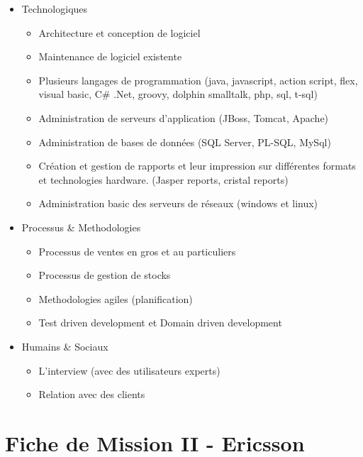 \documentclass{resume} %
\begin{document}
	\begin{itemize} 				
			\item Technologiques 
					\begin{itemize}
						\item Architecture et conception de logiciel 
						\item Maintenance de logiciel existente
						\item Plusieurs langages de programmation (java, javascript, action script, flex, visual basic, C\# .Net, groovy, dolphin smalltalk, php, sql, t-sql)
						\item Administration de serveurs d'application (JBoss, Tomcat, Apache)
						\item Administration de bases de données (SQL Server, PL-SQL, MySql)
						\item Création et gestion de rapports et leur impression sur différentes formats et technologies hardware. (Jasper reports, cristal reports)
						\item Administration basic des serveurs de réseaux (windows et linux)
					\end {itemize}
			\item Processus \& Methodologies 
					\begin{itemize}
						\item Processus de ventes en gros et au particuliers 
						\item Processus de gestion de stocks 
						\item Methodologies agiles (planification) 
						\item Test driven development et Domain driven development
					\end {itemize}
			\item  Humains \& Sociaux  
				\begin{itemize}
						\item L'interview (avec des utilisateurs experts)
						\item Relation avec des clients
					\end {itemize}

		\end{itemize}
		




\section{Fiche de Mission II - Ericsson }
\end{document}
